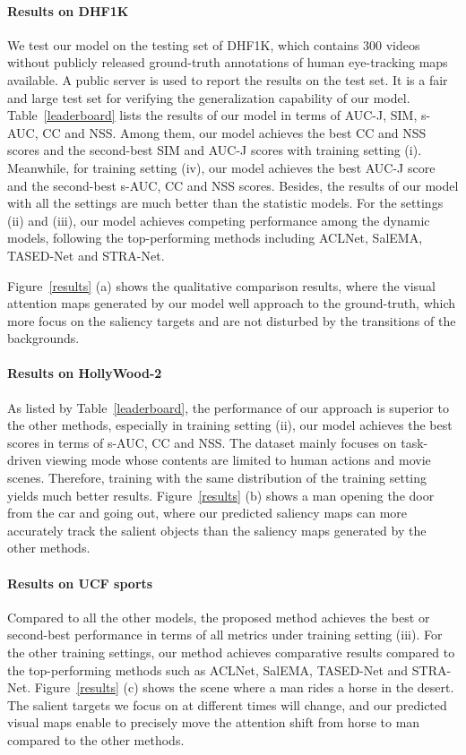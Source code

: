 \documentclass[review]{elsarticle}
\begin{document}
\paragraph{Results on DHF1K} We test our model on the testing set of DHF1K, which contains $300$ videos without publicly released ground-truth annotations of human eye-tracking maps available. A public server is used to report the results on the test set.
It is a fair and large test set for verifying the generalization capability of our model.
Table~\ref{leaderboard} lists the results of our model in terms of AUC-J, SIM, s-AUC, CC and NSS. Among them, our model achieves the best CC and NSS scores and the second-best SIM and AUC-J scores with training setting (i). Meanwhile, for training setting (iv), our model achieves the best AUC-J score and the second-best s-AUC, CC and NSS scores.
Besides, the results of our model with all the settings are much better than the statistic models.
For the settings (ii) and (iii), our model achieves competing performance among the dynamic models, following the top-performing methods including ACLNet, SalEMA, TASED-Net and STRA-Net.


Figure~\ref{results} (a) shows the qualitative comparison results, where the visual attention maps generated by our model well approach to the ground-truth, which more focus on the saliency targets and are not disturbed by the transitions of the backgrounds.

\paragraph{Results on HollyWood-2} As listed by Table~\ref{leaderboard}, the performance of our approach is superior to the other methods,  especially in training setting (ii), our model achieves the best scores in terms of s-AUC, CC and NSS.
The dataset mainly focuses on task-driven viewing mode whose contents are limited to human actions and movie scenes.
Therefore, training with the same distribution of the training setting yields much better results.
Figure~\ref{results} (b) shows a man opening the door from the car and going out, where our predicted saliency maps can more accurately track the salient objects than the saliency maps generated by the other methods.

\paragraph{Results on UCF sports} Compared to all the other models, the proposed method achieves the best or second-best performance in terms of all metrics under training setting (iii). For the other training settings, our method achieves comparative results compared to the top-performing methods such as ACLNet, SalEMA, TASED-Net and STRA-Net.
Figure~\ref{results} (c) shows the scene where a man rides a horse in the desert.
The salient targets we focus on at different times will change, and our predicted visual maps enable to precisely move the attention shift from horse to man compared to the other methods.
\end{document}

